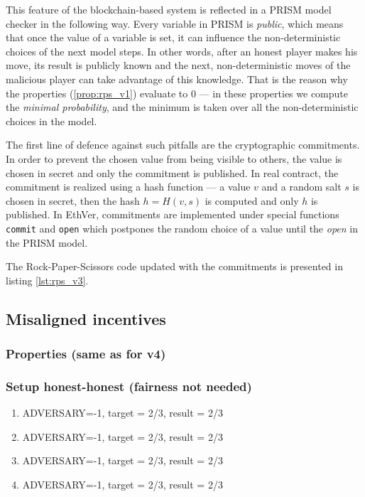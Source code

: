 \documentclass{article}
\begin{document}
This feature of the blockchain-based system is reflected in a PRISM model checker in the following way.
Every variable in PRISM is \emph{public}, which means that once the value of a variable is set, it can influence
the non-deterministic choices of the next model steps.
In other words, after an honest player makes his move, its result is publicly known and the next, non-deterministic
moves of the malicious player can take advantage of this knowledge.
That is the reason why the properties (\ref{prop:rps_v1}) evaluate to 0 --- in these properties we compute the
\emph{minimal probability}, and the minimum is taken over all the non-deterministic choices in the model.

The first line of defence against such pitfalls are the cryptographic commitments.
In order to prevent the chosen value from being visible to others, the value is chosen in secret and only
the commitment is published.
In real contract, the commitment is realized using a hash function --- a value $v$ and a random salt $s$ is chosen
in secret, then the hash $h = H(v, s)$ is computed and only $h$ is published.
In EthVer, commitments are implemented under special functions \lstinline{commit} and \lstinline{open} which
postpones the random choice of a value until the \emph{open} in the PRISM model.

The Rock-Paper-Scissors code updated with the commitments is presented in listing \ref{lst:rps_v3}.



\subsection{Misaligned incentives}

\subsubsection{Properties (same as for v4)}



\subsubsection{Setup honest-honest (fairness not needed)}

\begin{enumerate}
\item ADVERSARY=-1, target = 2/3, result = 2/3
\item ADVERSARY=-1, target = 2/3, result = 2/3
\item ADVERSARY=-1, target = 2/3, result = 2/3
\item ADVERSARY=-1, target = 2/3, result = 2/3
\end{enumerate}
\end{document}
